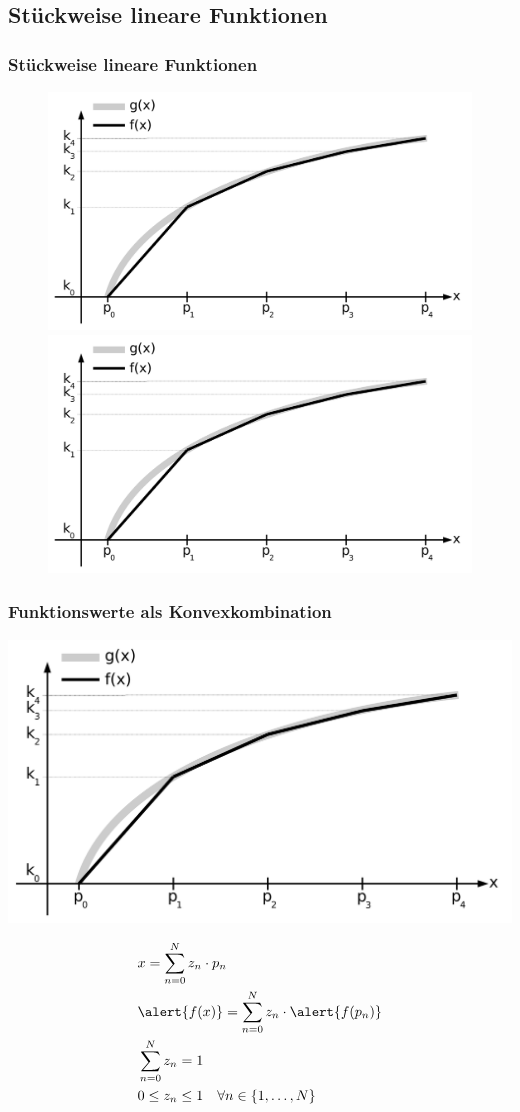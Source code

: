 \subsection{Stückweise lineare Funktionen}
\begin{frame}
 \frametitle{Stückweise lineare Funktionen}
 \begin{figure}
  \centering
  \includegraphics<1>[width=\linewidth,page=1]{Bilder/StueckweiseLineareFunktion1}
  \includegraphics<2>[width=\linewidth,page=2]{Bilder/StueckweiseLineareFunktion1}
 \end{figure}
\end{frame}

\begin{frame}
 \frametitle{Funktionswerte als Konvexkombination}
 \begin{flushright}
  \includegraphics[width=.5\textwidth,page=2]{Bilder/StueckweiseLineareFunktion1}
 \end{flushright}
 \vspace{-5ex}
 \begin{align*}
  &x = \sum_{n=0}^{N} z_n\cdot p_n\\
  &\alert{f(x)} = \sum_{n=0}^{N} z_n\cdot \alert{f(p_n)}\\
  &\sum_{n=0}^N z_n = 1\\
  &0 \leq z_n \leq 1\quad\forall n\in\{1, \ldots, N\}\qquad\qquad\mbox{}
 \end{align*}
\end{frame}

